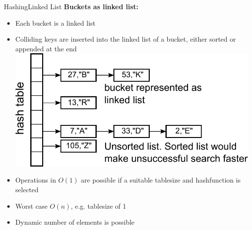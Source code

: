 \begin{frame}{Hashing}{Linked List}
  \textbf{Buckets as linked list:}
  \begin{itemize}
    \item<2->
      Each bucket is a linked list
    \item<3->
      Colliding keys are inserted into the linked list of a bucket, either sorted or appended at the end
\includegraphics[height=0.35\textheight]{Images/hashtable-buckets.pdf}
   \item<5->
     Operations in {\color{Mittel-Blau}$O(1)$} are possible if a suitable tablesize and hashfunction is
     selected
   \item<6->
     Worst case {\color{Mittel-Blau}$O(n)$}, e.g. tablesize of 1
   \item<7->
     Dynamic number of elements is possible 
  \end{itemize}
\end{frame}

